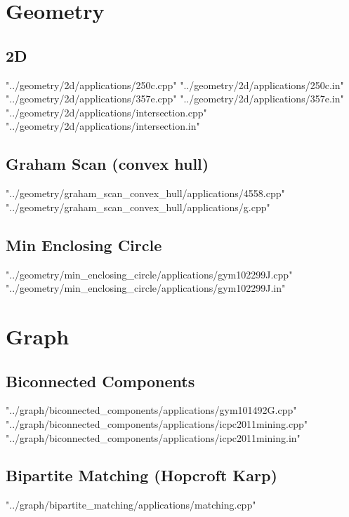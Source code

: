 \documentclass [12pt,onecolumn,oneside]{article}
\begin{document}
\newpage

\section{Geometry}
\subsection{ 2D}
 {"../geometry/2d/applications/250c.cpp"}
 {"../geometry/2d/applications/250c.in"}
 {"../geometry/2d/applications/357e.cpp"}
 {"../geometry/2d/applications/357e.in"}
 {"../geometry/2d/applications/intersection.cpp"}
 {"../geometry/2d/applications/intersection.in"}
\subsection{ Graham Scan (convex hull)}
 {"../geometry/graham_scan_convex_hull/applications/4558.cpp"}
 {"../geometry/graham_scan_convex_hull/applications/g.cpp"}
\subsection{ Min Enclosing Circle}
 {"../geometry/min_enclosing_circle/applications/gym102299J.cpp"}
 {"../geometry/min_enclosing_circle/applications/gym102299J.in"}
\newpage

\section{Graph}
\subsection{ Biconnected Components}
 {"../graph/biconnected_components/applications/gym101492G.cpp"}
 {"../graph/biconnected_components/applications/icpc2011mining.cpp"}
 {"../graph/biconnected_components/applications/icpc2011mining.in"}
\subsection{ Bipartite Matching (Hopcroft Karp)}
 {"../graph/bipartite_matching/applications/matching.cpp"}
\end{document}
